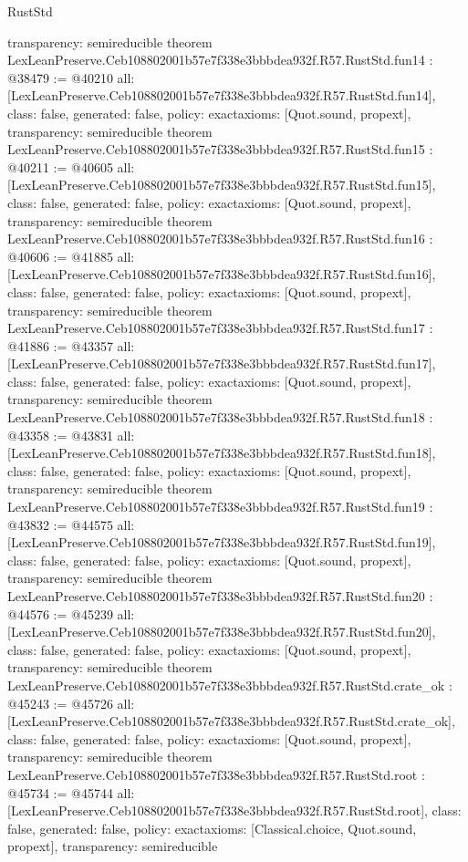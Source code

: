 \begin{lexlean}{RustStd}
\begin{coremodule}
{  transparency: semireducible
}
theorem LexLeanPreserve.Ceb108802001b57e7f338e3bbbdea932f.R57.RustStd.fun14 : @38479 := @40210 {
  all: [LexLeanPreserve.Ceb108802001b57e7f338e3bbbdea932f.R57.RustStd.fun14],
  class: false,
  generated: false,
  policy: exact{axioms: [Quot.sound, propext]},
  transparency: semireducible
}
theorem LexLeanPreserve.Ceb108802001b57e7f338e3bbbdea932f.R57.RustStd.fun15 : @40211 := @40605 {
  all: [LexLeanPreserve.Ceb108802001b57e7f338e3bbbdea932f.R57.RustStd.fun15],
  class: false,
  generated: false,
  policy: exact{axioms: [Quot.sound, propext]},
  transparency: semireducible
}
theorem LexLeanPreserve.Ceb108802001b57e7f338e3bbbdea932f.R57.RustStd.fun16 : @40606 := @41885 {
  all: [LexLeanPreserve.Ceb108802001b57e7f338e3bbbdea932f.R57.RustStd.fun16],
  class: false,
  generated: false,
  policy: exact{axioms: [Quot.sound, propext]},
  transparency: semireducible
}
theorem LexLeanPreserve.Ceb108802001b57e7f338e3bbbdea932f.R57.RustStd.fun17 : @41886 := @43357 {
  all: [LexLeanPreserve.Ceb108802001b57e7f338e3bbbdea932f.R57.RustStd.fun17],
  class: false,
  generated: false,
  policy: exact{axioms: [Quot.sound, propext]},
  transparency: semireducible
}
theorem LexLeanPreserve.Ceb108802001b57e7f338e3bbbdea932f.R57.RustStd.fun18 : @43358 := @43831 {
  all: [LexLeanPreserve.Ceb108802001b57e7f338e3bbbdea932f.R57.RustStd.fun18],
  class: false,
  generated: false,
  policy: exact{axioms: [Quot.sound, propext]},
  transparency: semireducible
}
theorem LexLeanPreserve.Ceb108802001b57e7f338e3bbbdea932f.R57.RustStd.fun19 : @43832 := @44575 {
  all: [LexLeanPreserve.Ceb108802001b57e7f338e3bbbdea932f.R57.RustStd.fun19],
  class: false,
  generated: false,
  policy: exact{axioms: [Quot.sound, propext]},
  transparency: semireducible
}
theorem LexLeanPreserve.Ceb108802001b57e7f338e3bbbdea932f.R57.RustStd.fun20 : @44576 := @45239 {
  all: [LexLeanPreserve.Ceb108802001b57e7f338e3bbbdea932f.R57.RustStd.fun20],
  class: false,
  generated: false,
  policy: exact{axioms: [Quot.sound, propext]},
  transparency: semireducible
}
theorem LexLeanPreserve.Ceb108802001b57e7f338e3bbbdea932f.R57.RustStd.crate_ok : @45243 := @45726 {
  all: [LexLeanPreserve.Ceb108802001b57e7f338e3bbbdea932f.R57.RustStd.crate_ok],
  class: false,
  generated: false,
  policy: exact{axioms: [Quot.sound, propext]},
  transparency: semireducible
}
theorem LexLeanPreserve.Ceb108802001b57e7f338e3bbbdea932f.R57.RustStd.root : @45734 := @45744 {
  all: [LexLeanPreserve.Ceb108802001b57e7f338e3bbbdea932f.R57.RustStd.root],
  class: false,
  generated: false,
  policy: exact{axioms: [Classical.choice, Quot.sound, propext]},
  transparency: semireducible
}


\end{coremodule}
\end{lexlean}
